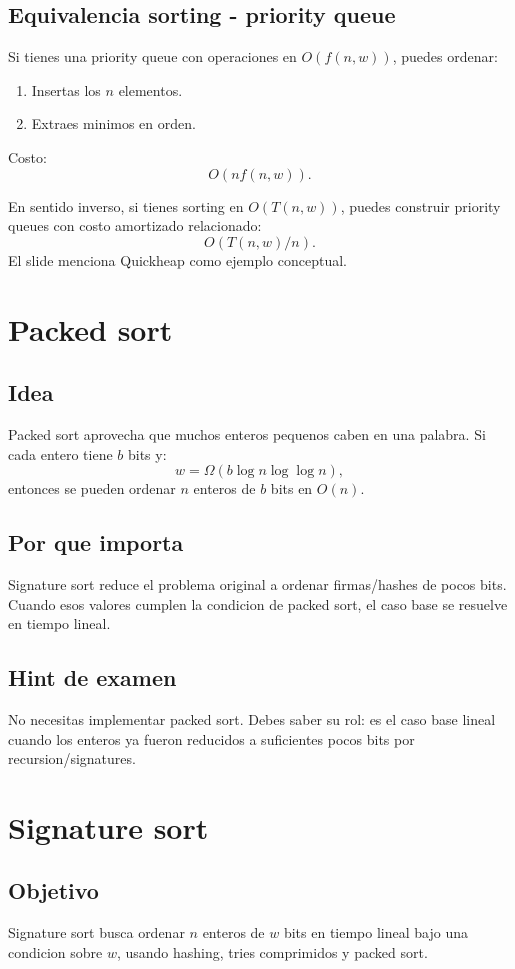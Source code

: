 \documentclass[10pt]{article}
\newcommand{\bigO}{O}
\begin{document}
\subsection{Equivalencia sorting - priority queue}
Si tienes una priority queue con operaciones en $\bigO(f(n,w))$, puedes ordenar:
\begin{enumerate}[leftmargin=*]
\item Insertas los $n$ elementos.
\item Extraes minimos en orden.
\end{enumerate}
Costo:
\[
\bigO(nf(n,w)).
\]

En sentido inverso, si tienes sorting en $\bigO(T(n,w))$, puedes construir
priority queues con costo amortizado relacionado:
\[
\bigO(T(n,w)/n).
\]
El slide menciona Quickheap como ejemplo conceptual.

\newpage
\section{Packed sort}

\subsection{Idea}
Packed sort aprovecha que muchos enteros pequenos caben en una palabra. Si cada
entero tiene $b$ bits y:
\[
w=\Omega(b\log n\log\log n),
\]
entonces se pueden ordenar $n$ enteros de $b$ bits en $\bigO(n)$.

\subsection{Por que importa}
Signature sort reduce el problema original a ordenar firmas/hashes de pocos
bits. Cuando esos valores cumplen la condicion de packed sort, el caso base se
resuelve en tiempo lineal.

\subsection{Hint de examen}
No necesitas implementar packed sort. Debes saber su rol: es el caso base
lineal cuando los enteros ya fueron reducidos a suficientes pocos bits por
recursion/signatures.

\newpage
\section{Signature sort}

\subsection{Objetivo}
Signature sort busca ordenar $n$ enteros de $w$ bits en tiempo lineal bajo una
condicion sobre $w$, usando hashing, tries comprimidos y packed sort.
\end{document}
